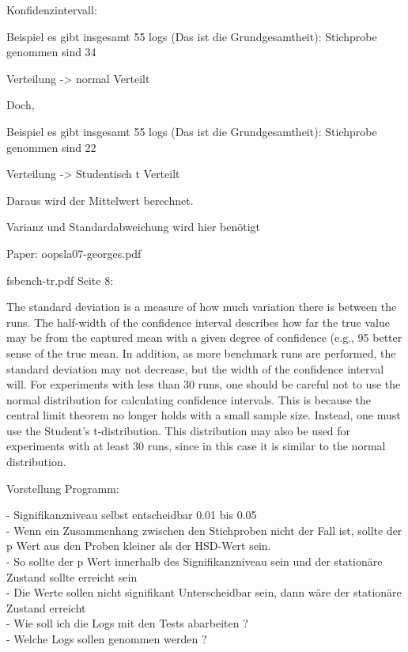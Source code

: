 Konfidenzintervall:

Beispiel es gibt insgesamt 55 logs (Das ist die Grundgesamtheit):
Stichprobe genommen sind 34

Verteilung -> normal Verteilt

Doch,

Beispiel es gibt insgesamt 55 logs (Das ist die Grundgesamtheit):
Stichprobe genommen sind 22

Verteilung -> Studentisch t Verteilt

Daraus wird der Mittelwert berechnet.

Varianz und Standardabweichung wird hier benötigt

Paper: oopsla07-georges.pdf

fsbench-tr.pdf Seite 8:

The standard deviation is a measure of how much variation there is between the
runs. The half-width of the confidence interval describes how far the true value may be
from the captured mean with a given degree of confidence (e.g., 95%
better sense of the true mean. In addition, as more benchmark runs are performed, the
standard deviation may not decrease, but the width of the confidence interval will.
For experiments with less than 30 runs, one should be careful not to use the normal
distribution for calculating confidence intervals. This is because the central limit theorem
no longer holds with a small sample size. Instead, one must use the Student’s t-distribution.
This distribution may also be used for experiments with at least 30 runs, since in this case
it is similar to the normal distribution.

Vorstellung Programm:

- Signifikanzniveau selbst entscheidbar 0.01 bis 0.05 \\
- Wenn ein Zusammenhang zwischen den Stichproben nicht der Fall ist, sollte der p Wert aus den Proben kleiner als der HSD-Wert sein.\\
- So sollte der p Wert innerhalb des Signifikanzniveau sein und der stationäre Zustand sollte erreicht sein\\
- Die Werte sollen nicht signifikant Unterscheidbar sein, dann wäre der stationäre Zustand erreicht\\
- Wie soll ich die Logs mit den Tests abarbeiten ?\\
- Welche Logs sollen genommen werden ? 
